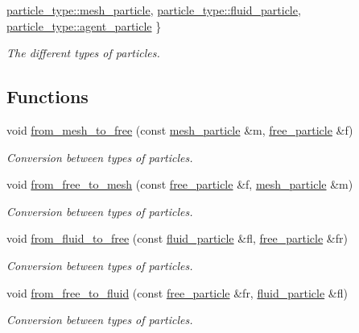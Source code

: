 \begin{DoxyCompactItemize}
$$\hyperlink{namespacephysim_1_1particles_a068e6cda6626fbd381c07a9835425b08a6dcdddb3b81f6e4419f4b2883f11ac46}{particle\+\_\+type\+::mesh\+\_\+particle}, 
\newline
\hyperlink{namespacephysim_1_1particles_a068e6cda6626fbd381c07a9835425b08acd1fa3faece552fbe658256d4d05d2a6}{particle\+\_\+type\+::fluid\+\_\+particle}, 
\hyperlink{namespacephysim_1_1particles_a068e6cda6626fbd381c07a9835425b08a8f5a9a8c6aed38c79edad63bfc681c2c}{particle\+\_\+type\+::agent\+\_\+particle}
 \}\begin{DoxyCompactList}\small\item\em The different types of particles. \end{DoxyCompactList}
\end{DoxyCompactItemize}
\subsection*{Functions}
\begin{DoxyCompactItemize}
\item 
void \hyperlink{namespacephysim_1_1particles_a27c0b9cd8f45bd93f376917858b0951e}{from\+\_\+mesh\+\_\+to\+\_\+free} (const \hyperlink{classphysim_1_1particles_1_1mesh__particle}{mesh\+\_\+particle} \&m, \hyperlink{classphysim_1_1particles_1_1free__particle}{free\+\_\+particle} \&f)
\begin{DoxyCompactList}\small\item\em Conversion between types of particles. \end{DoxyCompactList}\item 
void \hyperlink{namespacephysim_1_1particles_ae47fe8ddd8684c737761f5a4fd8dbc6f}{from\+\_\+free\+\_\+to\+\_\+mesh} (const \hyperlink{classphysim_1_1particles_1_1free__particle}{free\+\_\+particle} \&f, \hyperlink{classphysim_1_1particles_1_1mesh__particle}{mesh\+\_\+particle} \&m)
\begin{DoxyCompactList}\small\item\em Conversion between types of particles. \end{DoxyCompactList}\item 
void \hyperlink{namespacephysim_1_1particles_a48784a80a2e7e633a40a79fcd54e4f55}{from\+\_\+fluid\+\_\+to\+\_\+free} (const \hyperlink{classphysim_1_1particles_1_1fluid__particle}{fluid\+\_\+particle} \&fl, \hyperlink{classphysim_1_1particles_1_1free__particle}{free\+\_\+particle} \&fr)
\begin{DoxyCompactList}\small\item\em Conversion between types of particles. \end{DoxyCompactList}\item 
void \hyperlink{namespacephysim_1_1particles_a47e79e4da1099cd888baf9f67122d3d5}{from\+\_\+free\+\_\+to\+\_\+fluid} (const \hyperlink{classphysim_1_1particles_1_1free__particle}{free\+\_\+particle} \&fr, \hyperlink{classphysim_1_1particles_1_1fluid__particle}{fluid\+\_\+particle} \&fl)
\begin{DoxyCompactList}\small\item\em Conversion between types of particles. \end{DoxyCompactList}\end{DoxyCompactItemize}



